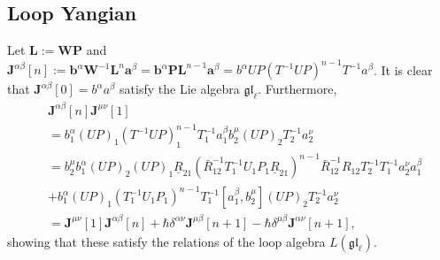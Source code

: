 \documentclass[11pt]{report}
\theoremstyle{definition}
\theoremstyle{remark}
\theoremstyle{remark}
\begin{document}
\subsection{Loop Yangian}

Let $\mathbf{L} := \mathbf{WP}$ and $\mathbf{J}^{\alpha\beta}[n] := \mathbf{b}^\alpha \mathbf{W}^{-1} \mathbf{L}^n \mathbf{a}^\beta = \mathbf{b}^\alpha \mathbf{P} \mathbf{L}^{n-1} \mathbf{a}^\beta = b^\alpha UP (T^{-1}UP)^{n-1} T^{-1} a^\beta$. It is clear that $\mathbf{J}^{\alpha\beta}[0] = b^\alpha a^\beta$ satisfy the Lie algebra $\mathfrak{gl}_\ell$. Furthermore,
\begin{align*}
&\mathbf{J}^{\alpha\beta}[n] \mathbf{J}^{\mu\nu}[1] \\
&= b_1^\alpha (UP)_1 (T^{-1}UP)_1^{n-1} T_1^{-1} a_1^\beta b_2^\mu (UP)_2 T_2^{-1} a_2^\nu \\
&= b_2^\mu b_1^\alpha (UP)_2 (UP)_1 \underline{R}_{21} (\bar R_{12}^{-1} T_1^{-1} U_1 P_1 \underline{R}_{21})^{n-1} \bar R_{12}^{-1} R_{12} T_2^{-1} T_1^{-1} a_2^\nu a_1^\beta \\
&+ b_1^\alpha (UP)_1 (T_1^{-1} U_1 P_1)^{n-1} T_1^{-1} [a_1^\beta,b_2^\mu] (UP)_2 T_2^{-1} a_2^\nu \\
&= \mathbf{J}^{\mu\nu}[1] \mathbf{J}^{\alpha\beta}[n] + \hbar \delta^{\alpha\nu} \mathbf{J}^{\mu\beta}[n+1] - \hbar \delta^{\mu\beta} \mathbf{J}^{\alpha\nu}[n+1],
\end{align*}
showing that these satisfy the relations of the loop algebra $L(\mathfrak{gl}_\ell)$.

\end{document}
